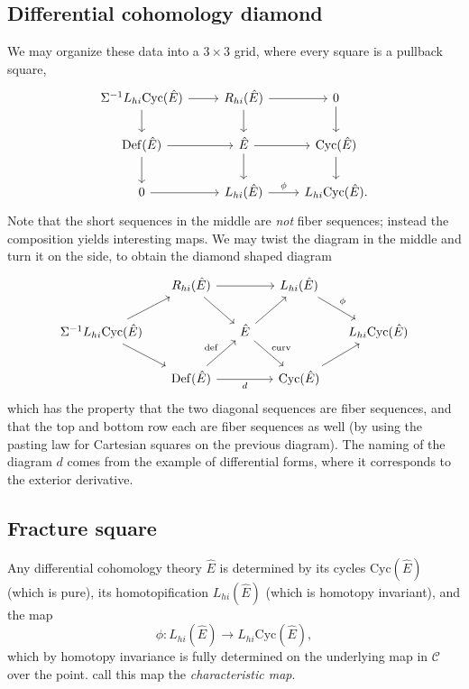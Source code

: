 \documentclass[a4paper]{book}
\newcommand{\lC}{\mathcal{C}}
\theoremstyle{definition}
\theoremstyle{remark}
\numberwithin{equation}{section}
\begin{document}
\subsection{Differential cohomology diamond}
We may organize these data into a $3 \times 3$ grid, where every square is a pullback square,
\begin{equation*}
\begin{tikzcd}
\Sigma^{-1} L_{hi}\mathrm{Cyc}(\hat{E}) 
\ar[r] \ar[d] 
& 
R_{hi}(\hat{E})
\ar[r] \ar[d] 
&
0
 \ar[d] 
\\
\mathrm{Def}(\hat{E})
\ar[r] \ar[d] 
&
\hat{E}
\ar[r] \ar[d] 
&
\mathrm{Cyc}(\hat{E})
\ar[d] 
\\
0 \ar[r]
&
L_{hi}(\hat{E}) \ar[r, "\phi"] &
L_{hi}\mathrm{Cyc}(\hat{E}).
\end{tikzcd}
\end{equation*}
Note that the short sequences in the middle are \emph{not} fiber sequences; instead the composition yields interesting maps. We may twist the diagram in the middle and turn it on the side, to obtain the diamond shaped diagram
\begin{equation*}
\begin{tikzcd}[column sep=0.5cm]
& 
R_{hi}(\hat{E}) 
\ar[dr]\ar[rr]
& & 
L_{hi}(\hat{E}) 
\ar[dr, "\phi"] 
&
\\ 	
\Sigma^{-1} L_{hi}\mathrm{Cyc}(\hat{E})
\ar[ur]
\ar[dr]
& & 
\hat{E} 
\ar[ur]
\ar[dr, "\mathrm{curv}"]
& & 
L_{hi}\mathrm{Cyc}(\hat{E})
\\
& 
\mathrm{Def}(\hat{E})
\ar[ur, "\mathrm{def}"]
\ar[rr, "d"']
& & 
\mathrm{Cyc}(\hat{E}) 
\ar[ur]
&
\end{tikzcd}
\end{equation*}
which has the property that the two diagonal sequences are fiber sequences, and that the top and bottom row each are fiber sequences as well (by using the pasting law for Cartesian squares on the previous diagram). The naming of the diagram $d$ comes from the example of differential forms, where it corresponds to the exterior derivative.

\subsection{Fracture square}
Any differential cohomology theory $\hat{E}$ is determined by its cycles $\mathrm{Cyc}(\hat{E})$ (which is pure), its homotopification $L_{hi}(\hat{E})$ (which is homotopy invariant), and the map
\[
\phi : L_{hi}(\hat{E}) \longrightarrow L_{hi}\mathrm{Cyc}(\hat{E}),
\]
which by homotopy invariance is fully determined on the underlying map in $\lC$ over the point. \cite{bunkenikolausvoelkl2016diffcoh} call this map the \emph{characteristic map}.
\end{document}
